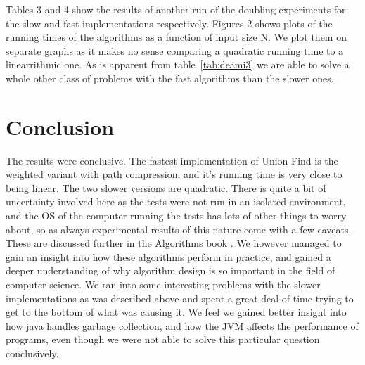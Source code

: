 \documentclass{article}
\begin{document}
Tables 3 and 4 show the results of another run of the doubling experiments for the slow and fast implementations respectively. Figures 2 shows plots of the running times of the algorithms as a function of input size N. We plot them on separate graphs as it makes no sense comparing a quadratic running time to a linearrithmic one. As is apparent from table~\ref{tab:deami3} we are able to solve a whole other class of problems with the fast algorithms than the slower ones.

\section{Conclusion}

The results were conclusive. The fastest implementation of Union Find is the weighted variant with path compression, and it's running time is very close to being linear. The two slower versions are quadratic. There is quite a bit of uncertainty involved here as the tests were not run in an isolated environment, and the OS of the computer running the tests has lots of other things to worry about, so as always experimental results of this nature come with a few caveats. These are discussed further in the Algorithms book \cite{Sedgewick:2012}. We however managed to gain an insight into how these algorithms perform in practice, and gained a deeper understanding of why algorithm design is so important in the field of computer science. We ran into some interesting problems with the slower implementations as was described above and spent a great deal of time trying to get to the bottom of what was causing it. We feel we gained better insight into how java handles garbage collection, and how the JVM affects the performance of programs, even though we were not able to solve this particular question conclusively.







\pagebreak
\end{document}
